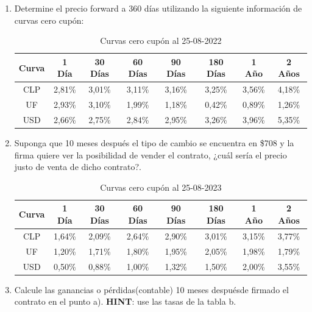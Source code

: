 \documentclass[12pt]{article}
\begin{document}
\begin{enumerate}[label=\textbf{\alph*)}]
\item Determine el precio forward a 360 días utilizando la siguiente información de curvas cero cupón:
\begin{table}[h!]
    \centering
    \caption{Curvas cero cupón al 25-08-2022}
    \begin{tabular}{|c|c|c|c|c|c|c|c|}
    \hline
    \textbf{Curva} & \textbf{1 Día} & \textbf{30 Días} & \textbf{60 Días} & \textbf{90 Días} & \textbf{180 Días} & \textbf{1 Año} & \textbf{2 Años} \\
    \hline
    CLP & 2{,}81\% & 3{,}01\% & 3{,}11\% & 3{,}16\% & 3{,}25\% & 3{,}56\% & 4{,}18\% \\
    UF  & 2{,}93\% & 3{,}10\% & 1{,}99\% & 1{,}18\% & 0{,}42\% & 0{,}89\% & 1{,}26\% \\
    USD & 2{,}66\% & 2{,}75\% & 2{,}84\% & 2{,}95\% & 3{,}26\% & 3{,}96\% & 5{,}35\% \\
    \hline
    \end{tabular}
\end{table}
\item	Suponga que 10 meses después el tipo de cambio se encuentra en \$708 y la firma quiere ver
la posibilidad de vender el contrato, ¿cuál sería el precio justo de venta de dicho contrato?.
\begin{table}[h!]
    \centering
    \caption{Curvas cero cupón al 25-08-2023}
    \begin{tabular}{|c|c|c|c|c|c|c|c|}
    \hline
    \textbf{Curva} & \textbf{1 Día} & \textbf{30 Días} & \textbf{60 Días} & \textbf{90 Días} & \textbf{180 Días} & \textbf{1 Año} & \textbf{2 Años} \\
    \hline
    CLP & 1{,}64\% & 2{,}09\% & 2{,}64\% & 2{,}90\% & 3{,}01\% & 3{,}15\% & 3{,}77\% \\
    UF  & 1{,}20\% & 1{,}71\% & 1{,}80\% & 1{,}95\% & 2{,}05\% & 1{,}98\% & 1{,}79\% \\
    USD & 0{,}50\% & 0{,}88\% & 1{,}00\% & 1{,}32\% & 1{,}50\% & 2{,}00\% & 3{,}55\% \\
    \hline
    \end{tabular}
\end{table}
\item Calcule las ganancias o pérdidas(contable) 10 meses despuésde firmado el contrato en el 
    punto a). \textbf{HINT}: use las tasas de la tabla b.
\end{enumerate}
\end{document}
